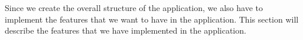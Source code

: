 Since we create the overall structure of the application, 
we also have to implement the features that we want to have in the application. 
This section will describe the features that we have implemented in the application.

